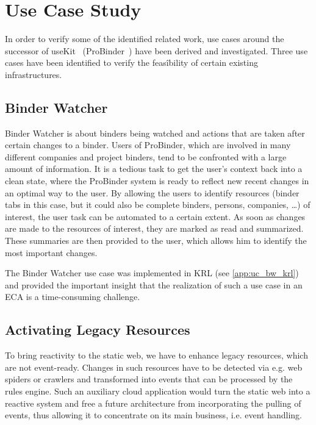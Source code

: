 \documentclass[11pt]{article}%
\begin{document}
\section{Use Case Study}
In order to verify some of the identified related work, use cases around the successor of useKit~\cite{2010-Rizzotti_Burkhart-useKit.pdf} (ProBinder~\cite{wwwprobinder}) have been derived and investigated. 
Three use cases have been identified to verify the feasîbility of certain existing infrastructures.

\subsection{Binder Watcher}
Binder Watcher is about binders being watched and actions that are taken after certain changes to a binder. Users of ProBinder, which are involved in many different companies and project binders, tend to be confronted with a large amount of information. It is a tedious task to get the user's context back into a clean state, where the ProBinder system is ready to reflect new recent changes in an optimal way to the user. By allowing the users to identify resources (binder tabs in this case, but it could also be complete binders, persons, companies, \dots) of interest, the user task can be automated to a certain extent. As soon as changes are made to the resources of interest, they are marked as read and summarized. These summaries are then provided to the user, which allows him to identify the most important changes.

The Binder Watcher use case was implemented in KRL (see \ref{app:uc_bw_krl}) and provided the important insight that the realization of such a use case in an ECA is a time-consuming challenge. 

\subsection{Activating Legacy Resources}
To bring reactivity to the static web, we have to enhance legacy resources, which are not event-ready. Changes in such resources have to be detected via e.g. web spiders or crawlers and transformed into events that can be processed by the rules engine. Such an auxiliary cloud application would turn the static web into a reactive system and free a future architecture from incorporating the pulling of events, thus allowing it to concentrate on its main business, i.e. event handling.
\end{document}
